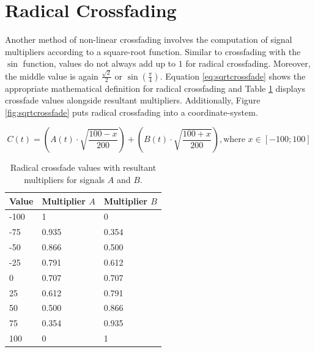 \documentclass[12pt,twoside]{report}
\begin{document}
\section{Radical Crossfading}

Another method of non-linear crossfading involves the computation of signal multipliers according to a square-root function. Similar to crossfading with the $\sin$ function, values do not always add up to $1$ for radical crossfading. Moreover, the middle value is again $\frac{\sqrt{2}}{2}$ or $\sin(\frac{\pi}{4})$. Equation \ref{eq:sqrtcrossfade} shows the appropriate mathematical definition for radical crossfading and Table \ref{tb:sqrtcrossfade} displays crossfade values alongside resultant multipliers. Additionally, Figure \ref{fig:sqrtcrossfade} puts radical crossfading into a coordinate-system.

\begin{equation}
  C(t) = (A(t) \cdot \sqrt{\frac{100 - x}{200}}) + (B(t) \cdot \sqrt{\frac{100 + x}{200}}), \text{where } x \in [-100;100]
  \label{eq:sqrtcrossfade}
\end{equation}

\begin{table}[ht!]

  \centering

  \begin{tabular}[]{| l | l | l |}
    \hline
    \rowcolor[gray]{0.8}
    Value & Multiplier $A$ & Multiplier $B$ \\\hline
    -100 & 1 & 0\\\hline
    -75 & 0.935 & 0.354\\\hline
    -50 & 0.866 & 0.500\\\hline
    -25 & 0.791 & 0.612\\\hline
    0 & 0.707 & 0.707\\\hline
    25 & 0.612 & 0.791\\\hline
    50 & 0.500 & 0.866\\\hline
    75 & 0.354 & 0.935\\\hline
    100 & 0 & 1\\
    \hline
  \end{tabular}

  \caption{Radical crossfade values with resultant multipliers for signals $A$ and $B$.}

  \label{tb:sqrtcrossfade}

\end{table}
\end{document}
